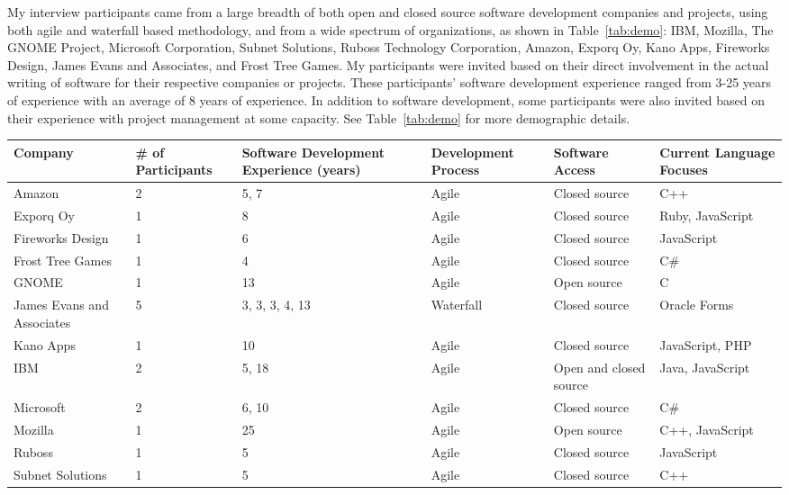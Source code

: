 My interview participants came from a large breadth of both open and closed source software development companies
and projects, using both  agile and waterfall based methodology, and from a wide spectrum of organizations, as shown in Table~\ref{tab:demo}: IBM, Mozilla, The GNOME Project, Microsoft Corporation, Subnet Solutions, Ruboss Technology Corporation, 
Amazon, Exporq Oy, Kano Apps, Fireworks Design, James Evans and Associates, and Frost Tree Games. 
My participants were invited based on their direct involvement in the actual writing of software for
their respective companies or projects. These participants' software development experience ranged from 3-25 years of experience
with an average of 8 years of experience.
In addition to software development, some participants were also invited based on their experience with project management
at some capacity. See Table~\ref{tab:demo} for more demographic details.

\begin{table*}[tb!]
\begin{center}
\begin{tabular}{| p{2cm} | p{2cm} | p{2cm} | p{2cm} | p{2cm} | p{2cm} |}
\hline
Company & \# of Participants & Software Development Experience (years) & Development Process & Software Access & Current Language Focuses \\
\hline
\hline
Amazon & 2 & 5, 7 & Agile & Closed source & C++ \\ \hline
Exporq Oy & 1 & 8 & Agile & Closed source & Ruby, JavaScript \\ \hline
Fireworks Design & 1 & 6 & Agile & Closed source & JavaScript \\ \hline
Frost Tree Games & 1 & 4 & Agile & Closed source & C\# \\ \hline
GNOME & 1 & 13 & Agile & Open source & C \\ \hline
James Evans and Associates & 5 & 3, 3, 3, 4, 13 & Waterfall & Closed source & Oracle Forms \\ \hline
Kano Apps & 1 & 10 & Agile & Closed source & JavaScript, PHP \\ \hline
IBM & 2 & 5, 18 & Agile & Open and closed source & Java, JavaScript \\ \hline
Microsoft & 2 & 6, 10 & Agile & Closed source & C\# \\ \hline
Mozilla & 1 & 25 & Agile & Open source & C++, JavaScript \\ \hline
Ruboss & 1 & 5 & Agile & Closed source & JavaScript \\ \hline 
Subnet Solutions & 1 & 5 & Agile & Closed source & C++ \\ \hline
\end{tabular}
\end{center}
\caption{Demographic information of interview participants.\label{tab:demo}}
\end{table*}

